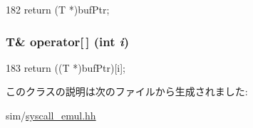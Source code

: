 \begin{DoxyCode}
182 { return (T *)bufPtr; }
\end{DoxyCode}
\hypertarget{classTypedBufferArg_a0534e977fc9fee424b3ef94f27a9ed61}{
\subsubsection[{operator[]}]{\setlength{\rightskip}{0pt plus 5cm}T\& operator\mbox{[}$\,$\mbox{]} (int {\em i})}}
\label{classTypedBufferArg_a0534e977fc9fee424b3ef94f27a9ed61}



\begin{DoxyCode}
183 { return ((T *)bufPtr)[i]; }
\end{DoxyCode}


このクラスの説明は次のファイルから生成されました:\begin{DoxyCompactItemize}
\item 
sim/\hyperlink{syscall__emul_8hh}{syscall\_\-emul.hh}\end{DoxyCompactItemize}
